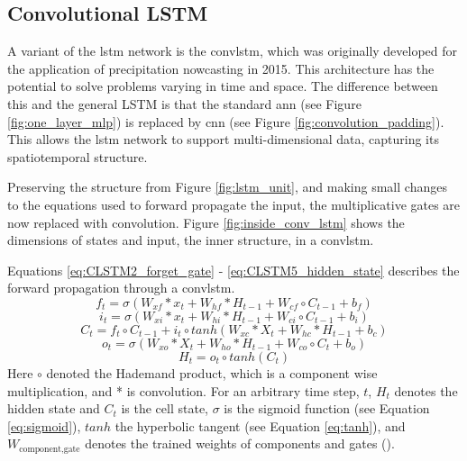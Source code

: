 \subsection{Convolutional LSTM}  \label{sec:convolutional_lstm}
A variant of the \acrshort{lstm} network is the \acrfull{convlstm}, which was originally developed for the application of precipitation nowcasting in 2015. This architecture has the potential to solve problems varying in time and space. The difference between this and the general LSTM is that the standard \acrshort{ann} (see Figure \ref{fig:one_layer_mlp}) is replaced by \acrshort{cnn} (see Figure \ref{fig:convolution_padding}). This allows the \acrshort{lstm} network to support multi-dimensional data, capturing its spatiotemporal structure. 


Preserving the structure from Figure \ref{fig:lstm_unit}, and making small changes to the equations used to forward propagate the input, the multiplicative gates are now replaced with convolution. 
Figure \ref{fig:inside_conv_lstm} shows the dimensions of states and input, the inner structure, in a \acrshort{convlstm}. 

Equations \eqref{eq:CLSTM2_forget_gate} - \eqref{eq:CLSTM5_hidden_state} describes the forward propagation through a \acrshort{convlstm}. 
\begin{equation} \label{eq:CLSTM2_forget_gate}
        f_t = \sigma \left( W_{xf}*x_t + W_{hf}*H_{t-1} + W_{cf}\circ C_{t-1}+b_f \right)
\end{equation}
\begin{equation} \label{eq:CLSTM1_input_gate}
    i_t = \sigma \left( W_{xi}*x_t + W_{hi}*H_{t-1} + W_{ci}\circ C_{t-1}+b_i \right) 
\end{equation}
\begin{equation} \label{eq:CLSTM3_cellstate}
        C_t = f_t \circ C_{t-1} +i_t\circ tanh\left( W_{xc}*X_t + W_{hc}*H_{t-1} + b_c \right)
\end{equation}
\begin{equation} \label{eq:CLSTM4_output_gate}
        o_t = \sigma \left( W_{xo}*X_t + W_{ho}*H_{t-1} + W_{co}\circ C_{t}+b_o \right)
\end{equation}
\begin{equation} \label{eq:CLSTM5_hidden_state}
        H_t = o_t \circ tanh \left( C_t \right)
\end{equation}
Here $\circ$ denoted the Hademand product, which is a component wise multiplication, and * is convolution. For an arbitrary time step, $t$, $H_{t}$ denotes the hidden state and $C_{t}$ is the cell state, $\sigma$ is the sigmoid function (see Equation \eqref{eq:sigmoid}), $tanh$ the hyperbolic tangent (see Equation \eqref{eq:tanh}), and $W_{\text{component}, \text{gate}}$ denotes the trained weights of components and gates (\cite{precip_nowcasting}). 


